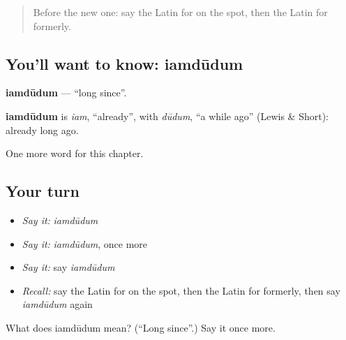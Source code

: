 \begin{quote}
Before the new one: say the Latin for on the spot, then the Latin for formerly.
\end{quote}

\subsection*{You'll want to know: iamdūdum}
\textbf{iamdūdum} — \textquotedblleft{}long since\textquotedblright{}.

\begin{cousinweb}
\textbf{iamdūdum} is \emph{iam}, \textquotedblleft{}already\textquotedblright{}, with \emph{dūdum}, \textquotedblleft{}a while ago\textquotedblright{} (Lewis \& Short): already long ago.
\end{cousinweb}

\begin{grammarlens}[title={What you've built}]
One more word for this chapter.
\end{grammarlens}

\subsection*{Your turn}
\begin{itemize}
\raggedright
  \item \emph{Say it:} \emph{iamdūdum}
  \item \emph{Say it:} \emph{iamdūdum}, once more
  \item \emph{Say it:} say \emph{iamdūdum}
  \item \emph{Recall:} say the Latin for on the spot, then the Latin for formerly, then say \emph{iamdūdum} again
\end{itemize}

\begin{tcolorbox}[breakable,colback=teal!4,colframe=teal!35!black,title={Before you move on}]
What does iamdūdum mean? (\textquotedblleft{}Long since\textquotedblright{}.) Say it once more.
\end{tcolorbox}
